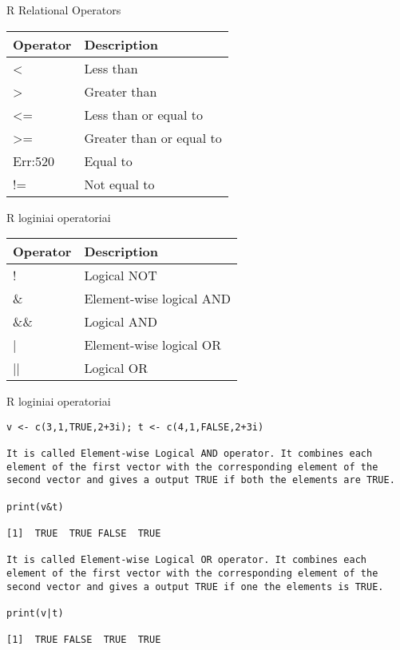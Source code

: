 \documentclass[11pt,xcolor=table]{beamer}
\begin{document}
\begin{frame}{R Relational Operators}
\begin{table}[]
\begin{tabular}{|l|l|}
\hline
\textbf{Operator} & \textbf{Description}     \\ \hline
\textless{}       & Less than                \\ \hline
\textgreater{}    & Greater than             \\ \hline
\textless{}=      & Less than or equal to    \\ \hline
\textgreater{}=   & Greater than or equal to \\ \hline
Err:520           & Equal to                 \\ \hline
!=                & Not equal to             \\ \hline
\end{tabular}
\end{table}
\end{frame}

\begin{frame}[fragile]{R loginiai operatoriai
}
\begin{table}[]
\begin{tabular}{|l|l|}
\hline
\textbf{Operator} & \textbf{Description}     \\ \hline
!                 & Logical NOT              \\ \hline
\&                & Element-wise logical AND \\ \hline
\&\&              & Logical AND              \\ \hline
|                 & Element-wise logical OR  \\ \hline
||                & Logical OR               \\ \hline
\end{tabular}
\end{table}


\end{frame}


\begin{frame}[fragile]{R loginiai operatoriai
}
\begin{lstlisting}
v <- c(3,1,TRUE,2+3i); t <- c(4,1,FALSE,2+3i)

It is called Element-wise Logical AND operator. It combines each element of the first vector with the corresponding element of the second vector and gives a output TRUE if both the elements are TRUE.

print(v&t)

[1]  TRUE  TRUE FALSE  TRUE

It is called Element-wise Logical OR operator. It combines each element of the first vector with the corresponding element of the second vector and gives a output TRUE if one the elements is TRUE.

print(v|t)

[1]  TRUE FALSE  TRUE  TRUE
\end{lstlisting}
\end{frame}
\end{document}
